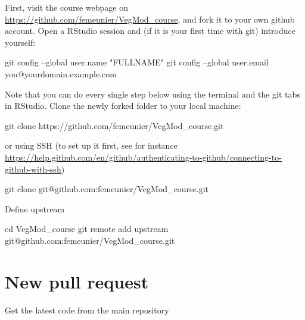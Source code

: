 \documentclass[12pt,oneside]{book}
\newenvironment{Shaded}{\begin{snugshade}}{\end{snugshade}}
\newcommand{\StringTok}[1]{\textcolor[rgb]{0.31,0.60,0.02}{#1}}
\newcommand{\FunctionTok}[1]{\textcolor[rgb]{0.00,0.00,0.00}{#1}}
\newcommand{\BuiltInTok}[1]{#1}
\newcommand{\NormalTok}[1]{#1}
\begin{document}
First, visit the course webpage on
\url{https://github.com/femeunier/VegMod_course}, and fork it to your
own github account. Open a RStudio session and (if it is your first time
with git) introduce yourself:

\begin{Shaded}
\begin{Highlighting}[]
\FunctionTok{git}\NormalTok{ config --global user.name }\StringTok{"FULLNAME"}
\FunctionTok{git}\NormalTok{ config --global user.email you@yourdomain.example.com}
\end{Highlighting}
\end{Shaded}

Note that you can do every single step below using the terminal and the
git tabs in RStudio. Clone the newly forked folder to your local
machine:

\begin{Shaded}
\begin{Highlighting}[]
\FunctionTok{git}\NormalTok{ clone https://github.com/femeunier/VegMod_course.git}
\end{Highlighting}
\end{Shaded}

or using SSH (to set up it first, see for instance
\url{https://help.github.com/en/github/authenticating-to-github/connecting-to-github-with-ssh})

\begin{Shaded}
\begin{Highlighting}[]
\FunctionTok{git}\NormalTok{ clone git@github.com:femeunier/VegMod_course.git}
\end{Highlighting}
\end{Shaded}

Define upstream

\begin{Shaded}
\begin{Highlighting}[]
\BuiltInTok{cd}\NormalTok{ VegMod_course}
\FunctionTok{git}\NormalTok{ remote add upstream git@github.com:femeunier/VegMod_course.git}
\end{Highlighting}
\end{Shaded}

\section*{New pull request}\label{new-pull-request}

Get the latest code from the main repository
\end{document}
